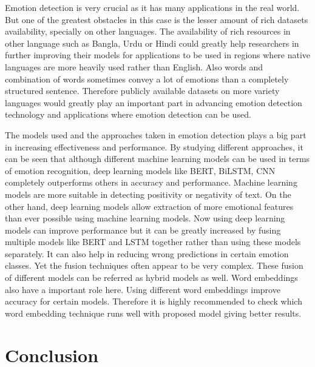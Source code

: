 \documentclass[runningheads]{llncs}
\begin{document}
Emotion detection is very crucial as it has many applications in the real world. But one of the greatest obstacles in this case is the lesser amount of rich datasets availability, specially on other languages. The availability of rich resources in other language such as Bangla, Urdu or Hindi could greatly help researchers in further improving their models for applications to be used in regions where native languages are more heavily used rather than English. Also words and combination of words sometimes convey a lot of emotions than a completely structured sentence. Therefore publicly available datasets on more variety languages would greatly play an important part in advancing emotion detection technology and applications where emotion detection can be used.  

The models used and the approaches taken in emotion detection plays a big part in increasing effectiveness and performance. By studying different approaches, it can be seen that although different machine learning models can be used in terms of emotion recognition, deep learning models like BERT, BiLSTM, CNN completely outperforms others in accuracy and performance. Machine learning models are more suitable in detecting positivity or negativity of text. On the other hand, deep learning models allow extraction of more emotional features than ever possible using machine learning models. Now using deep learning models can improve performance but it can be greatly increased by fusing multiple models like BERT and LSTM together rather than using these models separately. It can also help in reducing wrong predictions in certain emotion classes. Yet the fusion techniques often appear to be very complex. These fusion of different models can be referred as hybrid models as well. Word embeddings also have a important role here. Using different word embeddings improve accuracy for certain models. Therefore it is highly recommended to check which word embedding technique runs well with proposed model giving better results.


\section{Conclusion}
\end{document}
